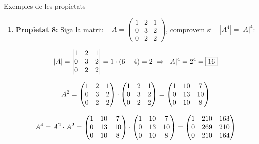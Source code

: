 \documentclass[11pt,a4paper]{article}
\newcommand{\fmm}[1]{\setbox0=\hbox{$#1$}\ifdim\wd0>\linewidth\fmdisp{#1}\else\mbox{\box0}\fi}
\newcommand{\fmdisp}[1]{\[\setbox2=\hbox{$\displaystyle #1$}\ifdim\wd2>\linewidth\resizebox{\linewidth}{!}{\box2}\else\box2\fi\]}
\begin{document}
\begin{fmex}{Exemples de les propietats}
\begin{enumerate}[label=\textbf{\arabic*.},leftmargin=*]
\fmdisp{\begin{vmatrix}a+1 & a+2 & a+3\\ 1 & 2 & 2\\ 4 & 3 & 4\end{vmatrix}=\begin{vmatrix}a & a & a\\ 1 & 2 & 2\\ 4 & 3 & 4\end{vmatrix}+\begin{vmatrix}1 & 2 & 3\\ 1 & 2 & 2\\ 4 & 3 & 4\end{vmatrix}=}

\fmdisp{=[8a+3a+8a-(8a+6a+4a)]+[8+9+16-(24+6+8)]=\boxed{a-5}}

\item \textbf{Propietat 8:} Siga la matriu \fmm{A=\begin{pmatrix}1 & 2 & 1\\ 0 & 3 & 2\\ 0 & 2 & 2\end{pmatrix}}, comprovem si \fmm{|A^4|=|A|^4}:

\fmdisp{|A|=\begin{vmatrix}1 & 2 & 1\\ 0 & 3 & 2\\ 0 & 2 & 2\end{vmatrix}=1\cdot(6-4)=2\ \Rightarrow\ |A|^4=2^4=\boxed{16}}

\fmdisp{A^2=\begin{pmatrix}1 & 2 & 1\\ 0 & 3 & 2\\ 0 & 2 & 2\end{pmatrix}\cdot\begin{pmatrix}1 & 2 & 1\\ 0 & 3 & 2\\ 0 & 2 & 2\end{pmatrix}=\begin{pmatrix}1 & 10 & 7\\ 0 & 13 & 10\\ 0 & 10 & 8\end{pmatrix}}

\fmdisp{A^4=A^2\cdot A^2=\begin{pmatrix}1 & 10 & 7\\ 0 & 13 & 10\\ 0 & 10 & 8\end{pmatrix}\cdot\begin{pmatrix}1 & 10 & 7\\ 0 & 13 & 10\\ 0 & 10 & 8\end{pmatrix}=\begin{pmatrix}1 & 210 & 163\\ 0 & 269 & 210\\ 0 & 210 & 164\end{pmatrix}}


\end{enumerate}
\end{fmex}
\end{document}
